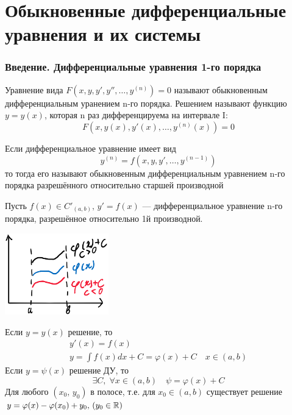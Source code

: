 \author{Andrei Tkachuk}

\part{Обыкновенные дифференциальные уравнения и их системы}
\section{Введение. Дифференциальные уравнения 1-го порядка}

\begin{Def}
    Уравнение вида $F(x, y, y', y'', \dots, y^{(n)}) = 0$ называют обыкновенным дифференциальным уранением n-го порядка. Решением называют функцию $y = y(x)$, которая n раз дифференцируема на интервале I: 
    \[
        F(x, y(x), y'(x), \dots, y^{(n)}(x)) = 0
    \]
\end{Def}

\begin{Def}
    Если дифференциальное уравнение имеет вид
    \[
        y^{(n)} = f(x, y, y', \dots, y^{(n - 1)})
    \]
    то тогда его называют обыкновенным дифференциальным уравнением n-го порядка разрешённого относительно старшей производной 
\end{Def}

\begin{Example}[моделный]
    Пусть $f(x) \in C'_{(a, b)}, \, y' = f(x)$ --- дифференциальное уравнение n-го порядка, разрешённое относительно 1й производной.
    \begin{floatingfigure}[l]{50mm}
        \noindent
        \hfil
        \includegraphics[width=45mm]{2_1_1.png}
        \hfil
    \end{floatingfigure}
    Если $y = y(x)$ решение, то
    \begin{gather*}
        y'(x) = f(x)\\ 
        y = \int{f(x)dx} + C = \varphi(x) + C \quad x \in (a, b)
    \end{gather*}
    Если $y = \psi(x)$ решение ДУ, то 
    \[
        \exists C,\; \forall x \in (a, b) \quad \psi = \varphi(x) + C
    \]
    Для любого $(x_0,\, y_0)$ в полосе, т.е. для $x_0 \in (a, b)$ существует решение $y = \varphi(x) - \varphi(x_0) + y_0, \, (y_0 \in \mathbb{R})$
\end{Example}

